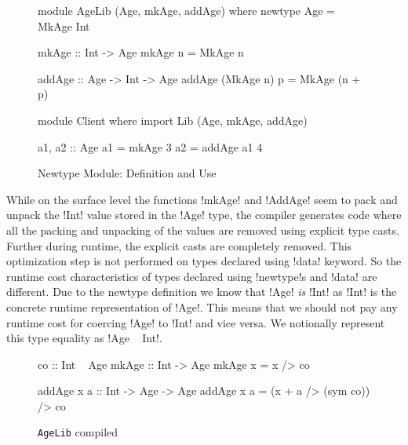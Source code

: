 \documentclass[manuscript,screen,nonacm]{acmart}
\begin{document}
\begin{figure}[ht]
 \centering
 \begin{minipage}[ht]{0.5\linewidth}
 \begin{code}
 module AgeLib (Age, mkAge, addAge) where
 newtype Age = MkAge Int

 mkAge :: Int -> Age
 mkAge n = MkAge n

 addAge :: Age -> Int -> Age
 addAge (MkAge n) p = MkAge (n + p)
 \end{code}
 \end{minipage}%
 \begin{minipage}[ht]{0.4\linewidth}
 \begin{code}
 module Client where
 import Lib (Age, mkAge, addAge)

 a1, a2 :: Age
 a1 = mkAge 3
 a2 = addAge a1 4

 \end{code}
 \end{minipage}
 \caption{Newtype Module: Definition and Use}
 \label{fig:newtype-modules}
\end{figure}
While on the surface level the functions !mkAge! and !AddAge! seem to pack and unpack
the !Int! value stored in the !Age! type, the compiler generates code where all the packing and unpacking of the values are removed using explicit type casts. Further during runtime, the explicit casts are completely removed. This optimization step is not performed on types declared using !data! keyword. So the runtime cost characteristics of types declared using !newtype!s and !data! are different. Due to the newtype definition
we know that !Age! \emph{is} !Int! as !Int! is the concrete runtime representation of !Age!. This means that we should not pay any runtime cost for coercing !Age! to !Int! and vice versa. We notionally represent this type equality as !Age ~ Int!.
\begin{figure}[ht]
 \centering
 \begin{minipage}[h]{0.4\linewidth}
 \begin{code}
 co :: Int ~ Age
 mkAge :: Int -> Age
 mkAge x = x /> co
 \end{code}
 \end{minipage}%
 \begin{minipage}[ht]{0.4\linewidth}
 \begin{code}
 addAge x a :: Int -> Age -> Age
 addAge x a = (x + a /> (sym co)) /> co
 \end{code}
 \end{minipage}
 \caption{\lstinline{AgeLib} compiled}
 \label{fig:compiled-code}
\end{figure}
\end{document}
